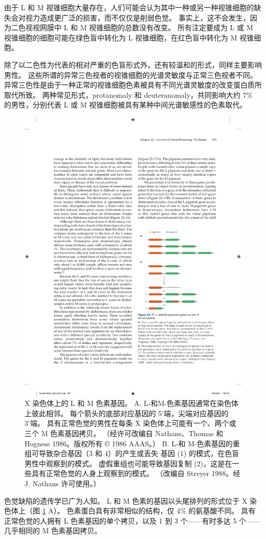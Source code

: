 由于 L 和 M 视锥细胞大量存在，人们可能会认为其中一种或另一种视锥细胞的缺失会对视力造成更广泛的损害，而不仅仅是削弱色觉。
事实上，这不会发生，因为二色视视网膜中 L 和 M 视锥细胞的总数没有改变。 
所有注定要成为 L 或 M 视锥细胞的细胞可能在绿色盲中转化为 L 视锥细胞，在红色盲中转化为 M 视锥细胞。


除了以二色性为代表的相对严重的色盲形式外，还有较温和的形式，同样主要影响男性。 
这些所谓的异常三色视者的视锥细胞的光谱灵敏度与正常三色视者不同。 
异常三色性是由于一种正常的视锥细胞色素被具有不同光谱灵敏度的改变蛋白质所取代所致。 
两种常见形式，protanomaly 和 deuteranomaly，共同影响大约 7\% 的男性，分别代表 L 或 M 视锥细胞被具有某种中间光谱敏感性的色素取代。

\begin{figure}[htbp]
	\centering
	\includegraphics[width=0.5\linewidth]{chap22/fig_22_17}
	\caption{X 染色体上的 L 和 M 色素基因。 
		A. L-和M-色素基因通常在染色体上彼此相邻。 
		每个箭头的底部对应基因的 5'端，尖端对应基因的 3'端。 
		具有正常色觉的男性在每条 X 染色体上可能有一个、两个或三个 M 色素基因拷贝。 （经许可改编自 Nathans、Thomas 和 Hogness 1986。版权所有 © 1986 AAAS。） 
		B. L-和 M-色素基因的重组可导致杂合基因（3 和 4）的产生或丢失 基因 (1) 的模式，在色盲男性中观察到的模式。 
		虚假重组也可能导致基因复制 (2)，这是在一些具有正常色觉的人身上观察到的模式。 （改编自 Streyer 1988。经 J. Nathans 许可使用。）}
	\label{fig:22_17}
\end{figure}


色觉缺陷的遗传学已广为人知。 
L 和 M 色素的基因以头尾排列的形式位于 X 染色体上（图 \ref{fig:22_17} A）。 
色素蛋白具有非常相似的结构，仅 4\% 的氨基酸不同。 
具有正常色觉的人拥有 L 色素基因的单个拷贝，以及 1 到 3 个——有时多达 5 个——几乎相同的 M 色素基因拷贝。


